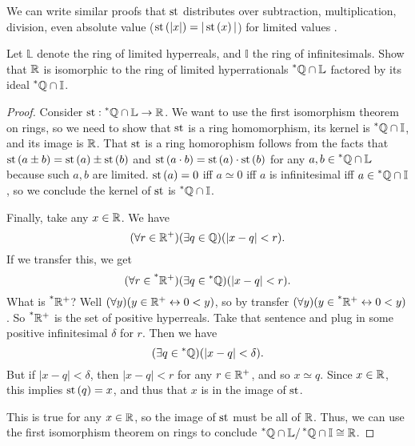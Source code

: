 We can write similar proofs that $\operatorname{st}$ distributes over subtraction, multiplication, division, even absolute value ($\operatorname{st}\left(|x|\right) = |\operatorname{st}\left(x\right)|$) for limited values \cite[Theorem~5.6.2]{goldblatt1998}.

\begin{thm}
    Let $\mathbb{L}$ denote the ring of limited hyperreals, and $\mathbb{I}$ the ring of infinitesimals. Show that $\mathbb{R}$ is isomorphic to the ring of limited hyperrationals $\prescript{*}{}{\mathbb{Q}} \cap \mathbb{L}$ factored by its ideal $\prescript{*}{}{\mathbb{Q}} \cap \mathbb{I}$.
\end{thm}

\begin{proof}
    Consider $\operatorname{st}: \prescript{*}{}{\mathbb{Q}} \cap \mathbb{L} \to \mathbb{R}$. We want to use the first isomorphism theorem on rings, so we need to show that $\operatorname{st}$ is a ring homomorphism, its kernel is $\prescript{*}{}{\mathbb{Q}} \cap \mathbb{I}$, and its image is $\mathbb{R}$. That $\operatorname{st}$ is a ring homorophism follows from the facts that $\operatorname{st}\left(a \pm b\right) = \operatorname{st}\left(a\right) \pm \operatorname{st}\left(b\right)$ and $\operatorname{st}\left(a \cdot b\right) = \operatorname{st}\left(a\right) \cdot \operatorname{st}\left(b\right)$ for any $a, b \in \prescript{*}{}{\mathbb{Q}} \cap \mathbb{L}$ because such $a, b$ are limited. $\operatorname{st}\left(a\right) = 0$ iff $a \simeq 0$ iff $a$ is infinitesimal iff $a \in \prescript{*}{}{\mathbb{Q}} \cap \mathbb{I}$, so we conclude the kernel of $\operatorname{st}$ is $\prescript{*}{}{\mathbb{Q}} \cap \mathbb{I}$. 

    Finally, take any $x \in \mathbb{R}$. We have
    \[ (\forall r \in \mathbb{R}^+)(\exists q \in \mathbb{Q})(|x - q| < r). \]
    If we transfer this, we get
    \[ (\forall r \in \prescript{*}{}{\mathbb{R}^+})(\exists q \in \prescript{*}{}{\mathbb{Q}})(|x - q| < r). \] 
    What is $\prescript{*}{}{\mathbb{R}^+}$? Well $(\forall y)(y \in \mathbb{R}^+ \leftrightarrow 0 < y)$, so by transfer $(\forall y)(y \in \prescript{*}{}{\mathbb{R}^+} \leftrightarrow 0 < y)$. So $\prescript{*}{}{\mathbb{R}^+}$ is the set of positive hyperreals. Take that sentence and plug in some positive infinitesimal $\delta$ for $r$. Then we have
    \[ (\exists q \in \prescript{*}{}{\mathbb{Q}})(|x - q| < \delta). \]
    But if $|x - q| < \delta$, then $|x - q| < r$ for any $r \in \mathbb{R}^+$, and so $x \simeq q$. Since $x \in \mathbb{R}$, this implies $\operatorname{st}\left(q\right) = x$, and thus that $x$ is in the image of $\operatorname{st}$. 
    
    This is true for any $x \in \mathbb{R}$, so the image of $\operatorname{st}$ must be all of $\mathbb{R}$. Thus, we can use the first isomorphism theorem on rings to conclude $\prescript{*}{}{\mathbb{Q}} \cap \mathbb{L} / \prescript{*}{}{\mathbb{Q}} \cap \mathbb{I} \cong \mathbb{R}$.
\end{proof}

